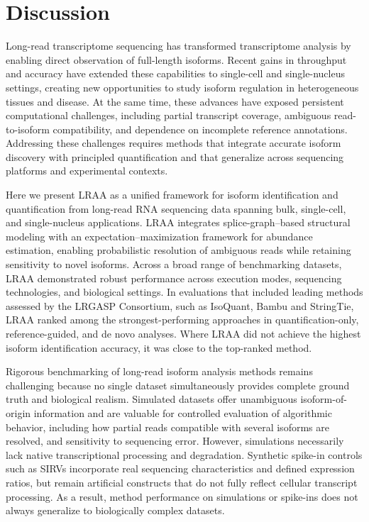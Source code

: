 \section{Discussion}\label{discussion}

Long-read transcriptome sequencing has transformed transcriptome analysis by enabling direct observation of full-length isoforms. Recent gains in throughput and accuracy have extended these capabilities to single-cell and single-nucleus settings, creating new opportunities to study isoform regulation in heterogeneous tissues and disease. At the same time, these advances have exposed persistent computational challenges, including partial transcript coverage, ambiguous read-to-isoform compatibility, and dependence on incomplete reference annotations. Addressing these challenges requires methods that integrate accurate isoform discovery with principled quantification and that generalize across sequencing platforms and experimental contexts.

Here we present LRAA as a unified framework for isoform identification and quantification from long-read RNA sequencing data spanning bulk, single-cell, and single-nucleus applications. LRAA integrates splice-graph--based structural modeling with an expectation--maximization framework for abundance estimation, enabling probabilistic resolution of ambiguous reads while retaining sensitivity to novel isoforms. Across a broad range of benchmarking datasets, LRAA demonstrated robust performance across execution modes, sequencing technologies, and biological settings. In evaluations that included leading methods assessed by the LRGASP Consortium, such as IsoQuant, Bambu and StringTie, LRAA ranked among the strongest-performing approaches in quantification-only, reference-guided, and de novo analyses. Where LRAA did not achieve the highest isoform identification accuracy, it was close to the top-ranked method.

Rigorous benchmarking of long-read isoform analysis methods remains challenging because no single dataset simultaneously provides complete ground truth and biological realism. Simulated datasets offer unambiguous isoform-of-origin information and are valuable for controlled evaluation of algorithmic behavior, including how partial reads compatible with several isoforms are resolved, and sensitivity to sequencing error. However, simulations necessarily lack native transcriptional processing and degradation. Synthetic spike-in controls such as SIRVs incorporate real sequencing characteristics and defined expression ratios, but remain artificial constructs that do not fully reflect cellular transcript processing. As a result, method performance on simulations or spike-ins does not always generalize to biologically complex datasets.

